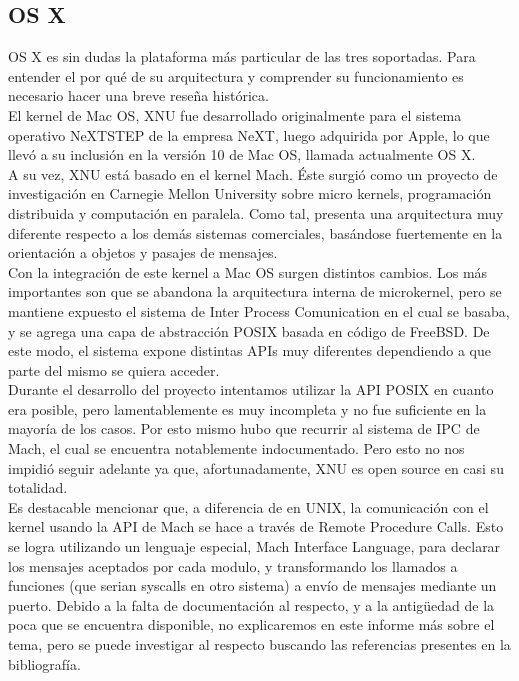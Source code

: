 \subsection{OS X}

OS X es sin dudas la plataforma más particular de las tres soportadas. Para
entender el por qué de su arquitectura y comprender su funcionamiento es
necesario hacer una breve reseña histórica.\\

El kernel de Mac OS, XNU fue desarrollado originalmente para el sistema
operativo NeXTSTEP de la empresa NeXT, luego adquirida por Apple, lo que llevó
a su inclusión en la versión 10 de Mac OS, llamada actualmente OS X.\\

A su vez, XNU está basado en el kernel Mach. Éste surgió como un proyecto de
investigación en Carnegie Mellon University sobre micro kernels, programación
distribuida y computación en paralela. Como tal, presenta una arquitectura muy
diferente respecto a los demás sistemas comerciales, basándose fuertemente en la
orientación a objetos y pasajes de mensajes.\\

Con la integración de este kernel a Mac OS surgen distintos cambios. Los más
importantes son que se abandona la arquitectura interna de microkernel, pero se
mantiene expuesto el sistema de Inter Process Comunication en el cual se
basaba, y se agrega una capa de abstracción POSIX basada en código de FreeBSD.
De este modo, el sistema expone distintas APIs muy diferentes dependiendo a que
parte del mismo se quiera acceder.\\

Durante el desarrollo del proyecto intentamos utilizar la API POSIX en cuanto
era posible, pero lamentablemente es muy incompleta y no fue suficiente
en la mayoría de los casos. Por esto mismo hubo que recurrir al sistema de IPC
de Mach, el cual se encuentra notablemente indocumentado. Pero esto no nos impidió
seguir adelante ya que, afortunadamente, XNU es open source en casi su totalidad. \\

Es destacable mencionar que, a diferencia de en UNIX, la comunicación con el
kernel usando la API de Mach se hace a través de Remote Procedure Calls. Esto
se logra utilizando un lenguaje especial, Mach Interface Language, para
declarar los mensajes aceptados por cada modulo, y transformando los llamados a
funciones (que serian syscalls en otro sistema) a envío de mensajes mediante un
puerto.  Debido a la falta de documentación al respecto, y a la antigüedad de
la poca que se encuentra disponible, no explicaremos en este informe más sobre
el tema, pero se puede investigar al respecto buscando las referencias
presentes en la bibliografía.\\


